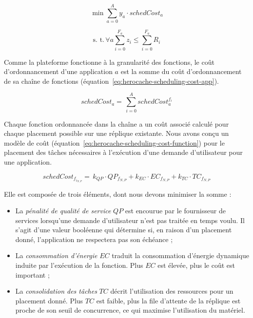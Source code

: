\begin{equation}
    \min \sum_{a = 0}^{A} y_a \cdot schedCost_{a}
\label{eq:herocache-objective-scheduling}
\end{equation}

\begin{equation}
    \text{s. t.} \, \forall a \sum_{i = 0}^{F_a} z_i \leq \sum_{i = 0}^{F_a} R_{i}
\label{eq:herocache-constraint-scheduling}
\end{equation}

Comme la plateforme fonctionne à la granularité des fonctions, le coût d'ordonnancement d'une application $a$ est la somme du coût d'ordonnancement de sa chaîne de fonctions (équation~\ref{eq:herocache-scheduling-cost-app}).

\begin{equation}
    schedCost_{a} = \, \sum_{i = 0}^{A} schedCost^{{{f}_{i}}}_{a}
\label{eq:herocache-scheduling-cost-app}
\end{equation}

Chaque fonction ordonnancée dans la chaîne a un coût associé calculé pour chaque placement possible sur une réplique existante.
Nous avons conçu un modèle de coût (équation~\ref{eq:herocache-scheduling-cost-function}) pour le placement des tâches nécessaires à l'exécution d'une demande d'utilisateur pour une application. 

\begin{equation}
    schedCost_{{f}_{{i}_{N, P}}} = \, k_{QP} \cdot QP_{{f}_{N, P}} + k_{EC} \cdot {EC}_{{f}_{N, P}} + k_{TC} \cdot TC_{{f}_{N, P}}
\label{eq:herocache-scheduling-cost-function}
\end{equation}

Elle est composée de trois éléments, dont nous devons minimiser la somme :

\begin{itemize}
    \item La \textit{pénalité de qualité de service} $QP$ est encourue par le fournisseur de services lorsqu'une demande d'utilisateur n'est pas traitée en temps voulu. Il s'agit d'une valeur booléenne qui détermine si, en raison d'un placement donné, l'application ne respectera pas son échéance ;
    \item La \textit{consommation d'énergie} $EC$ traduit la consommation d'énergie dynamique induite par l'exécution de la fonction. Plus $EC$ est élevée, plus le coût est important ;
    \item La \textit{consolidation des tâches} $TC$ décrit l'utilisation des ressources pour un placement donné. Plus $TC$ est faible, plus la file d'attente de la réplique est proche de son seuil de concurrence, ce qui maximise l'utilisation du matériel.
\end{itemize}


